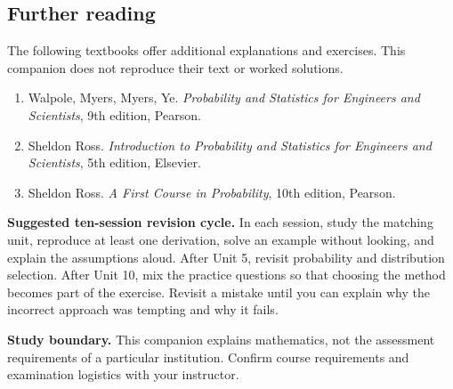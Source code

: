 \subsection*{Further reading}
The following textbooks offer additional explanations and exercises.
This companion does not reproduce their text or worked solutions.
\begin{enumerate}
\item Walpole, Myers, Myers, Ye. \emph{Probability and Statistics for Engineers
and Scientists}, 9th edition, Pearson.
\item Sheldon Ross. \emph{Introduction to Probability and Statistics for
Engineers and Scientists}, 5th edition, Elsevier.
\item Sheldon Ross. \emph{A First Course in Probability}, 10th edition,
Pearson.
\end{enumerate}

\textbf{Suggested ten-session revision cycle.} In each session, study the
matching unit, reproduce at least one derivation, solve an example without
looking, and explain the assumptions aloud. After Unit 5, revisit probability
and distribution selection. After Unit 10, mix the practice questions so
that choosing the method becomes part of the exercise. Revisit a mistake
until you can explain why the incorrect approach was tempting and why it fails.

\textbf{Study boundary.} This companion explains mathematics, not the
assessment requirements of a particular institution. Confirm course
requirements and examination logistics with your instructor.
